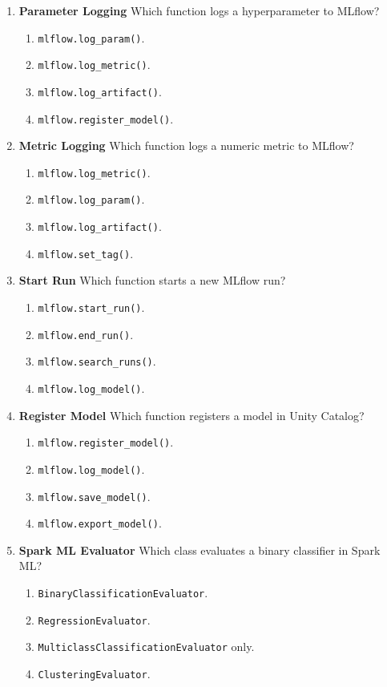 \documentclass{article}
\begin{document}
\begin{enumerate}[label=\textbf{Q\arabic*.}]
		\item \textbf{Parameter Logging}
		Which function logs a hyperparameter to MLflow?
		\begin{enumerate}[label=\Alph*.]
			\item \texttt{mlflow.log\_param()}.
			\item \texttt{mlflow.log\_metric()}.
			\item \texttt{mlflow.log\_artifact()}.
			\item \texttt{mlflow.register\_model()}.
		\end{enumerate}
		
		\item \textbf{Metric Logging}
		Which function logs a numeric metric to MLflow?
		\begin{enumerate}[label=\Alph*.]
			\item \texttt{mlflow.log\_metric()}.
			\item \texttt{mlflow.log\_param()}.
			\item \texttt{mlflow.log\_artifact()}.
			\item \texttt{mlflow.set\_tag()}.
		\end{enumerate}
		
		\item \textbf{Start Run}
		Which function starts a new MLflow run?
		\begin{enumerate}[label=\Alph*.]
			\item \texttt{mlflow.start\_run()}.
			\item \texttt{mlflow.end\_run()}.
			\item \texttt{mlflow.search\_runs()}.
			\item \texttt{mlflow.log\_model()}.
		\end{enumerate}
		
		\item \textbf{Register Model}
		Which function registers a model in Unity Catalog?
		\begin{enumerate}[label=\Alph*.]
			\item \texttt{mlflow.register\_model()}.
			\item \texttt{mlflow.log\_model()}.
			\item \texttt{mlflow.save\_model()}.
			\item \texttt{mlflow.export\_model()}.
		\end{enumerate}
		
		\item \textbf{Spark ML Evaluator}
		Which class evaluates a binary classifier in Spark ML?
		\begin{enumerate}[label=\Alph*.]
			\item \texttt{BinaryClassificationEvaluator}.
			\item \texttt{RegressionEvaluator}.
			\item \texttt{MulticlassClassificationEvaluator} only.
			\item \texttt{ClusteringEvaluator}.
		\end{enumerate}
		

\end{enumerate}
\end{document}
